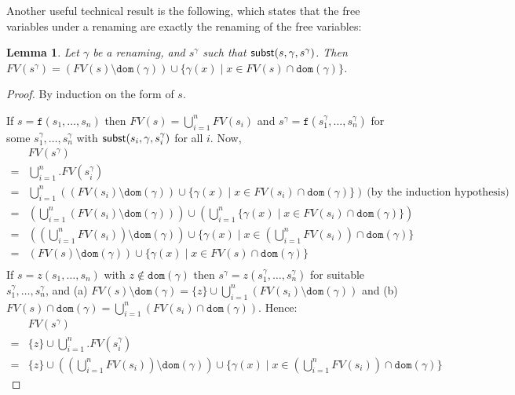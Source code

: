 \documentclass{lmcs}
\theoremstyle{theorem}\newtheorem{theorem}[dummy]{Theorem}
\theoremstyle{theorem}\newtheorem{lemma}[dummy]{Lemma}
\theoremstyle{theorem}\newtheorem{corollary}[dummy]{Corollary}
\theoremstyle{definition}\newtheorem{definition}[dummy]{Definition}
\theoremstyle{definition}\newtheorem{example}[dummy]{Example}
\newcommand{\FV}{\mathit{FV}}
\newcommand{\domain}{\mathtt{dom}}
\newcommand{\identifier}[1]{\mathtt{#1}}
\newcommand{\afun}{\identifier{f}}
\begin{document}
Another useful technical result is the following, which states that the free variables under a
renaming are exactly the renaming of the free variables:

\begin{lemma}\label{lem:freerename}
Let $\gamma$ be a renaming, and $s^\gamma$ such that $\mathsf{subst}(s,\gamma,s^\gamma)$.
Then $\FV(s^\gamma) = (\FV(s) \setminus \domain(\gamma)) \cup
\{ \gamma(x) \mid x \in \FV(s) \cap \domain(\gamma) \}$.
\end{lemma}

\begin{proof}
By induction on the form of $s$.

If $s = \afun(s_1,\dots,s_n)$ then $\FV(s) = \bigcup_{i=1}^n \FV(s_i)$ and $s^\gamma =
\afun(s_1^\gamma,\dots,s_n^\gamma)$ for some $s_1^\gamma,\dots,s_n^\gamma$ with
$\mathsf{subst}(s_i,\gamma,s_i^\gamma)$ for all $i$.
Now,
\[
\begin{array}{cl}
& \FV(s^\gamma) \\
= & \bigcup_{i=1}^n. \FV(s_i^\gamma) \\
= & \bigcup_{i=1}^n ((\FV(s_i) \setminus \domain(\gamma)) \cup \{ \gamma(x) \mid x \in \FV(s_i)
  \cap \domain(\gamma) \})\ \text{(by the induction hypothesis)} \\
= & (\bigcup_{i=1}^n (\FV(s_i) \setminus \domain(\gamma))) \cup
    (\bigcup_{i=1}^n \{ \gamma(x) \mid x \in \FV(s_i) \cap \domain(\gamma) \}) \\
= & ((\bigcup_{i=1}^n \FV(s_i)) \setminus \domain(\gamma)) \cup
    \{ \gamma(x) \mid x \in (\bigcup_{i=1}^n \FV(s_i)) \cap \domain(\gamma) \} \\
= & (\FV(s) \setminus \domain(\gamma)) \cup
    \{ \gamma(x) \mid x \in \FV(s) \cap \domain(\gamma) \} \\
\end{array}
\]
If $s = z(s_1,\dots,s_n)$ with $z \notin \domain(\gamma)$ then $s^\gamma = z(s_1^\gamma,\dots,
s_n^\gamma)$ for suitable $s_1^\gamma,\dots,s_n^\gamma$, and (a) $\FV(s) \setminus \domain(\gamma)
= \{ z \} \cup \bigcup_{i = 1}^n (\FV(s_i) \setminus \domain(\gamma))$ and (b) $\FV(s) \cap
\domain(\gamma) = \bigcup_{i=1}^n (\FV(s_i) \cap \domain(\gamma))$.  Hence:
\[
\begin{array}{cl}
& \FV(s^\gamma) \\
= & \{ z \} \cup \bigcup_{i=1}^n. \FV(s_i^\gamma) \\
= & \{ z \} \cup ((\bigcup_{i=1}^n \FV(s_i)) \setminus \domain(\gamma)) \cup
  \{ \gamma(x) \mid x \in (\bigcup_{i=1}^n \FV(s_i)) \cap \domain(\gamma) \}\ 

\end{array}\]
\end{proof}
\end{document}
